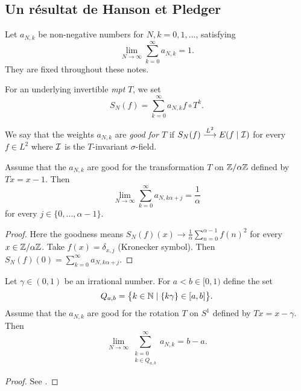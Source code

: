 \documentclass[12pt,a4paper]{article}
\begin{document}
\begin{appendices}

\section{Un résultat de Hanson et Pledger}\label{sec:HP}

%

Let $a_{N,k}$ be non-negative numbers for $N,k = 0, 1, \ldots$, satisfying 
$$
\lim_{N \to \infty} \sum_{k=0}^\infty a_{N,k} =1. 
$$
They are fixed throughout these notes. 

For an underlying invertible \emph{mpt} $T$, we set
$$
S_N(f) = \sum_{k=0}^\infty a_{N,k} f \circ T^k.
$$

We say that the weights $a_{N,k}$ are \emph{good for $T$} if 
$S_N(f) \overset{L^2}{\longrightarrow} E(f \mid \mathcal{I})$ for every 
$f \in L^2$ where $\mathcal{I}$ is the $T$-invariant $\sigma$-field. 

\begin{lemma}
Assume that the $a_{N,k}$ are good for the transformation 
 $T$ on $\mathbb{Z}/\alpha\mathbb{Z}$ defined by $Tx = x - 1$. Then 
$$
\lim_{N \to \infty} \sum_{k=0}^\infty a_{N,k\alpha+j} = \frac{1}{\alpha}
$$
for every $j \in \{0, \ldots, \alpha-1\}$. 
\end{lemma}

\begin{proof}
Here the goodness means $S_N(f)(x) \to \frac{1}{\alpha} \sum_{n=0}^{\alpha-1} {f(n)}^2$ for 
every $x \in \mathbb{Z}/\alpha\mathbb{Z}$. 
Take $f(x) = \delta_{x,j}$ (Kronecker symbol). 
Then $S_N(f)(0) = \sum_{k=0}^\infty a_{N,k\alpha+j}$.
\end{proof}


\begin{lemma}
Let $\gamma \in (0,1)$ be an irrational number. For $a < b \in [0,1)$ define the set  
$$
Q_{a,b} = \bigl\{k \in \mathbb{N} \mid \{k\gamma\} \in [a,b] \bigr\}.  
$$
Assume that the $a_{N,k}$ are good for the rotation  
 $T$ on $S^1$ defined by $Tx = x - \gamma$. 
 Then 
$$
\lim_{N \to \infty} \sum_{\substack{k=0 \\ k \in Q_{a,b}}}^\infty a_{N,k} = b-a.
$$
\end{lemma}


\begin{proof}
See \cite{HP}.
\end{proof}

\end{appendices}
\end{document}
